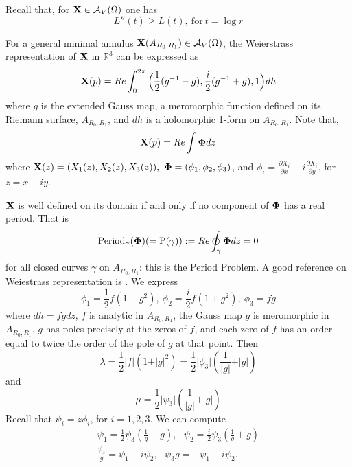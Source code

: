 \documentclass[11pt]{amsart}
\numberwithin{equation}{section}
\theoremstyle{theorem}
\theoremstyle{definition}
\numberwithin{equation}{section}
\begin{document}
Recall that, for $\bold{X}\in \mathcal{A}_V(\Omega )$ one has
\begin{equation}
    \nonumber
    L''(t) \geq L(t),\ \text{for}\  t=\log r
\end{equation}

For a general minimal annulus $\bold{X}(A_{R_0,R_1}) \in \mathcal{A}_V(\Omega)$, the Weierstrass representation of $\bold{X}$ in $\mathbb{R}^3$ can be expressed as
$$
\bold{X}(p)=Re \int_0^{2\pi} \Big( \frac{1}{2}(g^{-1}-g), \frac{i}{2}(g^{-1}+g),1\Big)dh
$$
where $g$ is the extended Gauss map, a meromorphic function defined on its Riemann surface, $A_{R_0,R_1}$, and $dh$ is a holomorphic 1-form on $A_{R_0,R_1}$. Note that,
$$
\bold{X}(p)=Re\int \bold{\Phi} dz
$$
where $\bold{X}(z) =(X_1(z),X_2(z),X_3(z)),\ \bold{\Phi} =(\phi_1,\phi_2,\phi_3)$, and $\phi_i =\frac{\partial X_i}{\partial x}- i\frac{\partial X_i}{\partial y}$, for $z=x+iy$. 

$\bold{X}$ is well defined on its domain if and only if no component of $\bold{\Phi}$ has a real period. That is
$$
 \text{Period}_{\gamma}(\bold{\Phi})(=\text{P}(\gamma)):= Re \oint_{\gamma} \bold{\Phi} dz=0
$$
for all closed curves $\gamma$ on $A_{R_0,R_1}$: this is the Period Problem. A good reference on Weiestrass representation is \cite{hoffman1997complete}. 
We express
\begin{equation} \label{phis}
    \phi_1 =\frac{1}{2}f(1-g^2), \  \phi_2=\frac{i}{2}f(1+g^2), \  \phi_3 =fg
\end{equation}
where $dh=fgdz$, $f$ is analytic in $A_{R_0,R_1}$, the Gauss map $g$ is meromorphic in $A_{R_0,R_1}$, $g$ has poles precisely at the zeros of $f$, and each zero of $f$ has an order equal to twice the order of the pole of $g$ at that point. Then
\begin{equation}
    \lambda = \frac{1}{2} \vert f\vert (1+\vert g\vert^2) =\frac{1}{2} \vert \phi_3 \vert (\frac{1}{\vert g\vert} +\vert g\vert )
\end{equation}
and
\begin{equation} \label{eqn: mu}
    \mu = \frac{1}{2} \vert \psi_3 \vert (\frac{1}{\vert g\vert} +\vert g\vert )
\end{equation}
Recall that $\psi_i = z\phi_i$, for $i=1,2,3$. We can compute 
\begin{equation} \label{def. psi3}
     \begin{split}
    \psi_1=\frac{1}{2}\psi_3 (\frac{1}{g}-g), \ \  \ \psi_2=\frac{i}{2}\psi_3 (\frac{1}{g}+g) \\
    \frac{\psi_3}{g} = \psi_1- i\psi_2, \  \  \  \psi_3 g = -\psi_1 -i\psi_2 .
    \end{split}
\end{equation}
\end{document}
